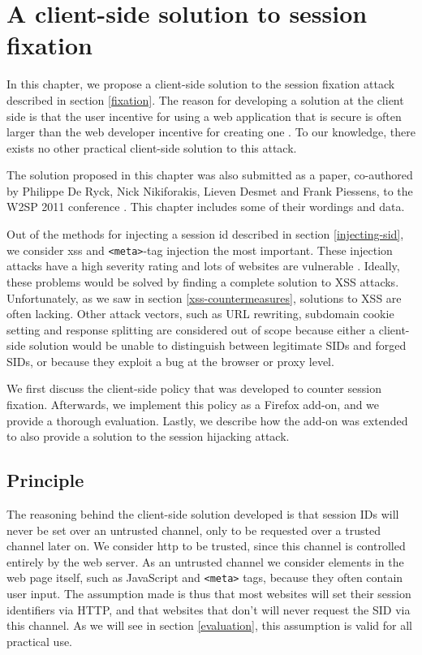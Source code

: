 \chapter{A client-side solution to session fixation}\label{fixation-solution}
In this chapter, we propose a client-side solution to the \gls{session fixation} attack described in section \ref{fixation}. The reason for developing a solution at the client side is that the user incentive for using a web application that is secure is often larger than the web developer incentive for creating one \cite{Johns2011}. To our knowledge, there exists no other practical client-side solution to this attack.

The solution proposed in this chapter was also submitted as a paper, co-authored by Philippe De Ryck, Nick Nikiforakis, Lieven Desmet and Frank Piessens, to the W2SP 2011 conference \cite{Bonne2011}. This chapter includes some of their wordings and data.

Out of the methods for injecting a \gls{session id} described in section \ref{injecting-sid}, we consider \gls{xss} and \texttt{<meta>}-tag injection the most important. These injection attacks have a high severity rating \cite{Williams2010} and lots of websites are vulnerable \cite{Brown2010}. Ideally, these problems would be solved by finding a complete solution to XSS attacks. Unfortunately, as we saw in section \ref{xss-countermeasures}, solutions to XSS are often lacking. Other attack vectors, such as URL rewriting, subdomain cookie setting and response splitting are considered out of scope because either a client-side solution would be unable to distinguish between legitimate SIDs and forged SIDs, or because they exploit a bug at the browser or proxy level.

We first discuss the client-side policy that was developed to counter session fixation. Afterwards, we implement this policy as a Firefox add-on, and we provide a thorough evaluation. Lastly, we describe how the add-on was extended to also provide a solution to the session hijacking attack.

\section{Principle}

The reasoning behind the client-side solution developed is that session IDs will never be set over an untrusted channel, only to be requested over a trusted channel later on. We consider \gls{http} to be trusted, since this channel is controlled entirely by the web server. As an untrusted channel we consider elements in the web page itself, such as JavaScript and \texttt{<meta>} tags, because they often contain user input. The assumption made is thus that most websites will set their session identifiers via HTTP, and that websites that don't will never request the SID via this channel. As we will see in section \ref{evaluation}, this assumption is valid for all practical use.

